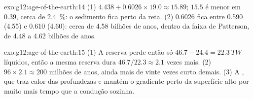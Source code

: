\begin{solution}{exo:g12:age-of-the-earth:14}
(1) $4.438 + 0.6026 \times 19.0 \approx 15.89$; $15.5$ é menor em $0.39$,
cerca de \qty{2.4}{\percent}: o sedimento fica perto da reta. (2) 0.6026
fica entre 0.590 (4.55) e 0.610 (4.60): cerca de 4.58 bilhões de anos, dentro
da faixa de Patterson, de 4.48 a 4.62 bilhões de anos.
\end{solution}

\begin{solution}{exo:g12:age-of-the-earth:15}
(1) A reserva perde então só $46.7 - 24.4 = \qty{22.3}{TW}$ líquidos, então a
mesma reserva dura $46.7/22.3 \approx 2.1$ vezes mais. (2) $96 \times 2.1 \approx
200$ milhões de anos, ainda mais de vinte vezes curto demais. (3) A , que traz calor das profundezas e mantém o gradiente perto da
superfície alto por muito mais tempo que a condução sozinha.
\end{solution}

